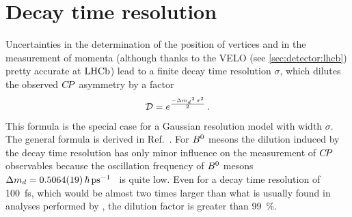 \section{Decay time resolution}
\label{sec:dataanalysis::resolution}

Uncertainties in the determination of the position of vertices and in the
measurement of momenta (although thanks to the VELO (see
\cref{sec:detector:lhcb}) pretty accurate  at $\lhcb$) lead to a finite decay
time resolution $\sigma$, which dilutes the observed $\CP$ asymmetry by a
factor
\begin{align}
  \mathcal{D} = e^{\frac{-\dmd^2\,\sigma^2}{2}} \, .
\end{align}
This formula is the special case for a Gaussian resolution model with width
$\sigma$. The general formula is derived in
Ref.~\cite{ResolutionDilutionFactor}. For $\Bd$ mesons the dilution induced by
the decay time resolution has only minor influence on the measurement of $\CP$
observables because the oscillation frequency of $\Bd$ mesons $\dmd =
\SI{0.5064\pm0.0019}{\hbar\invps}$~\cite{HFAG} is quite low. Even for a decay time
resolution of \SI{100}{\fs}, which would be almost two times larger than what
is usually found in analyses performed by \lhcb, the dilution factor is
greater than \SI{99}{\percent}.